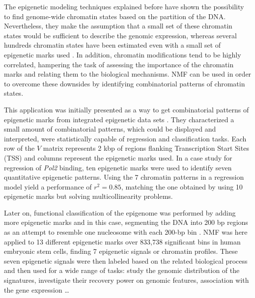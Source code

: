 The epigenetic modeling techniques explained before have shown the possibility to find genome-wide chromatin states based on the partition of the DNA. Nevertheless, they make the assumption that a small set of these chromatin states would be sufficient to describe the genomic expression, whereas several hundreds chromatin states have been estimated even with a small set of epigenetic marks used \cite{Ucar2011}. In addition, chromatin modifications tend to be highly correlated, hampering the task of assessing the importance of the chromatin marks and relating them to the biological mechanisms. NMF can be used in order to overcome these downsides by identifying combinatorial patterns of chromatin states.

\medskip

This application was initially presented as a way to get combinatorial patterns of epigenetic marks from integrated epigenetic data sets \cite{Cieslik2014}. They characterized a small amount of combinatorial patterns, which could be displayed and interpreted, were statistically capable of regression and classification tasks. Each row of the \(V\) matrix represents 2 kbp of regions flanking Transcription Start Sites (TSS) and columns represent the epigenetic marks used. In a case study for regression of \textit{Pol2} binding, ten epigenetic marks were used to identify seven quantitative epigenetic patterns. Using the 7 chromatin patterns in a regression model yield a performance of \( r^2 = 0.85 \), matching the one obtained by using 10 epigenetic marks but solving multicollinearity problems.

\medskip

Later on, functional classification of the epigenome was performed by adding more epigenetic marks and in this case, segmenting the DNA into 200 bp regions as an attempt to resemble one nucleosome with each 200-bp bin \cite{Gandolfi2017}. NMF was here applied to 13 different epigenetic marks over 833,738 significant bins in human embryonic stem cells, finding 7 epigenetic signals or chromatin profiles. These seven epigenetic signals were then labeled based on the related biological process and then used for a wide range of tasks: study the genomic distribution of the signatures, investigate their recovery power on genomic features, association with the gene expression \ldots




